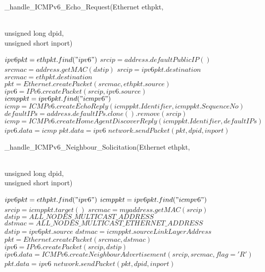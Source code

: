 \documentclass[10pt,a4paper,titlepage]{report}
\begin{document}
\begin{algorithm}
	\caption{\_handle\_ICMPv6\_Echo\_Request(Ethernet ethpkt,}\\
	\qquad \qquad \qquad \qquad \qquad \qquad \qquad \qquad unsigned long dpid,\\
	\qquad \qquad \qquad \qquad \qquad \qquad \qquad \qquad unsigned short inport)\\
	\begin{algorithmic}
		\STATE $ipv6pkt = ethpkt.find("ipv6")$
			\STATE $srcip = address.defaultPublicIP()$
			\STATE $srcmac = address.getMAC(dstip)$
		\ELSE
			\STATE $srcip = ipv6pkt.destination$
			\STATE $srcmac = ethpkt.destination$
		\ENDIF
		\STATE $pkt = Ethernet.createPacket(srcmac, ethpkt.source)$
		\STATE $ipv6 = IPv6.createPacket(srcip, ipv6.source)$
		\STATE $icmppkt = ipv6pkt.find("icmpv6")$
			\STATE $icmp = ICMPv6.createEchoReply(icmppkt.Identifier, icmppkt.SequenceNo)$
			\STATE $defaultIPs = address.defaultIPs.clone().remove(srcip)$
			\STATE $icmp = ICMPv6.createHomeAgentDiscoverReply(icmppkt.Identifier, defaultIPs)$
		\ENDIF
		\STATE $ipv6.data = icmp$
		\STATE $pkt.data = ipv6$
		\STATE $network.sendPacket(pkt,dpid, inport)$
	\end{algorithmic}
\end{algorithm}

\begin{algorithm}
	\caption{\_handle\_ICMPv6\_Neighbour\_Solicitation(Ethernet ethpkt,}\\
	\qquad \qquad \qquad \qquad \qquad \qquad \qquad \qquad \qquad \qquad unsigned long dpid,\\
	\qquad \qquad \qquad \qquad \qquad \qquad \qquad \qquad \qquad \qquad unsigned short inport)\\
	\begin{algorithmic}[1]
		\STATE $ipv6pkt = ethpkt.find("ipv6")$
		\STATE $icmppkt = ipv6pkt.find("icmpv6")$
		\STATE $srcip = icmppkt.target()$
		\STATE $srcmac = myaddress.getMAC(srcip)$
		\IF {$ipv6pkt.source\ \textbf{is}\ \textbf{UNSPECIFIED}$}
			\STATE $dstip = ALL\_NODES\_MULTICAST\_ADDRESS$
			\STATE $dstmac = ALL\_NODES\_MULTICAST\_ETHERNET\_ADDRESS$
		\ELSE
			\STATE $dstip = ipv6pkt.source$
			\STATE $dstmac = icmppkt.sourceLinkLayerAddress$
		\ENDIF
		\STATE $pkt = Ethernet.createPacket(srcmac, dstmac)$
		\STATE $ipv6 = IPv6.createPacket(srcip, dstip)$
		\STATE $ipv6.data = ICMPv6.createNeighbourAdvertisement(srcip, srcmac, flag = 'R')$
		\STATE $pkt.data = ipv6$
		\STATE $network.sendPacket(pkt, dpid, inport)$
	\end{algorithmic}
\end{algorithm}
\end{document}
